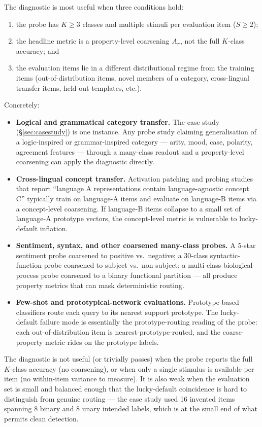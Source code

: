 \documentclass[11pt,letterpaper]{article}
\begin{document}
The diagnostic is most useful when three conditions hold:
\begin{enumerate}[label=(\roman*),leftmargin=2.4em]
  \item the probe has $K \geq 3$ classes and multiple stimuli per
        evaluation item ($S \geq 2$);
  \item the headline metric is a property-level
        coarsening $A_\pi$, not the full $K$-class accuracy; and
  \item the evaluation items lie in a different distributional
        regime from the training items (out-of-distribution items,
        novel members of a category, cross-lingual transfer items,
        held-out templates, etc.).
\end{enumerate}
Concretely:
\begin{itemize}
  \item \textbf{Logical and grammatical category transfer.} The case
        study (\S\ref{sec:casestudy}) is one instance. Any probe
        study claiming generalisation of a logic-inspired or
        grammar-inspired category --- arity, mood, case, polarity,
        agreement features --- through a many-class readout and a
        property-level coarsening can apply the diagnostic directly.
  \item \textbf{Cross-lingual concept transfer.} Activation patching
        and probing studies that report ``language A representations
        contain language-agnostic concept C''
        \citep{dumas2025tongue} typically train on language-A items
        and evaluate on language-B items via a concept-level
        coarsening. If language-B items collapse to a small set of
        language-A prototype vectors, the concept-level metric is
        vulnerable to lucky-default inflation.
  \item \textbf{Sentiment, syntax, and other coarsened many-class
        probes.} A 5-star sentiment probe coarsened to positive vs.\
        negative; a 30-class syntactic-function probe coarsened to
        subject vs.\ non-subject; a multi-class biological-process
        probe coarsened to a binary functional partition --- all
        produce property metrics that can mask deterministic
        routing.
  \item \textbf{Few-shot and prototypical-network evaluations.}
        Prototype-based classifiers
        \citep{snell2017protonets,mensink2013ncm} route each query
        to its nearest support prototype. The lucky-default failure
        mode is essentially the prototype-routing reading of the
        probe: each out-of-distribution item is
        nearest-prototype-routed, and the coarse-property metric
        rides on the prototype labels.
\end{itemize}
The diagnostic is not useful (or trivially passes) when the probe
reports the full $K$-class accuracy (no coarsening), or when only a
single stimulus is available per item (no within-item variance to
measure). It is also weak when the evaluation set is small and
balanced enough that the lucky-default coincidence is hard to
distinguish from genuine routing --- the case study used 16 invented
items spanning 8 binary and 8 unary intended labels, which is at
the small end of what permits clean detection.
\end{document}
